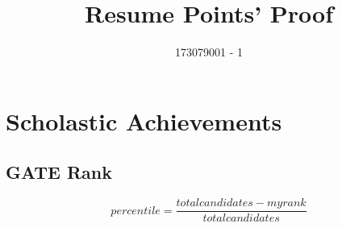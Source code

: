 \documentclass{article}
\title{Resume Points' Proof}
\author{173079001 - 1}
\date{}
\begin{document}
\maketitle
\tableofcontents
\newpage
\section{Scholastic Achievements}
	\subsection{GATE Rank}
		$$percentile = \frac{total candidates - myrank }{total candidates}$$
		\begin{figure}[h]
		\end{figure}

\newpage
\end{document}
